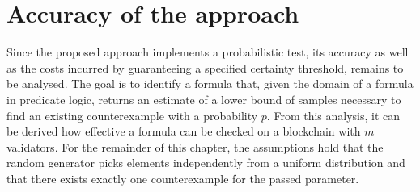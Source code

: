 \section{Accuracy of the approach}
Since the proposed approach implements a probabilistic test, its accuracy as well as the costs incurred by guaranteeing a specified certainty threshold, remains to be analysed. The goal is to identify a formula that, given the domain of a formula in predicate logic, returns an estimate of a lower bound of samples necessary to find an existing counterexample with a probability $p$. From this analysis, it can be derived how effective a formula can be checked on a blockchain with $m$ validators. For the remainder of this chapter, the assumptions hold that the random generator picks elements independently from a uniform distribution and that there exists exactly one counterexample for the passed parameter.

